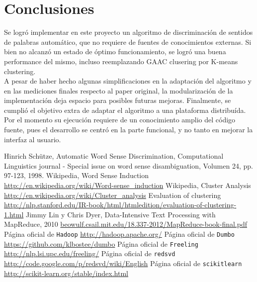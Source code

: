 \documentclass[11pt]{article}
\begin{document}
\section{Conclusiones}
Se logró implementar en este proyecto un algoritmo de discriminación de sentidos de palabras automático, que no requiere de fuentes de conocimientos externas. Si bien no alcanzó un estado de óptimo funcionamiento, se logró una buena performance del mismo, incluso reemplazando GAAC clusering por K-means clustering.\\
A pesar de haber hecho algunas simplificaciones en la adaptación del algoritmo y en las mediciones finales respecto al paper original, la modularización de la implementación deja espacio para posibles futuras mejoras.
Finalmente, se cumplió el objetivo extra de adaptar el algoritmo a una plataforma distribuída. Por el momento su ejecución requiere de un conocimiento amplio del código fuente, pues el desarrollo se centró en la parte funcional, y no tanto en mejorar la interfaz al usuario.


\begin{thebibliography}{99}

 Hinrich Schütze, Automatic Word Sense Discrimination, Computational Linguistics journal - Special issue on word sense disambiguation, Volumen 24, pp. 97-123, 1998.
 Wikipedia, Word Sense Induction \url{http://en.wikipedia.org/wiki/Word-sense_induction}
 Wikipedia, Cluster Analysis \url{http://en.wikipedia.org/wiki/Cluster_analysis}
 Evaluation of clustering \url{http://nlp.stanford.edu/IR-book/html/htmledition/evaluation-of-clustering-1.html}
 Jimmy Lin y Chris Dyer, Data-Intensive Text Processing with MapReduce, 2010 \url{beowulf.csail.mit.edu/18.337-2012/MapReduce-book-final.pdf}
 Página oficial de \texttt{Hadoop} \url{http://hadoop.apache.org/}
 Página oficial de \texttt{Dumbo} \url{https://github.com/klbostee/dumbo}
 Página oficial de \texttt{Freeling} \url{http://nlp.lsi.upc.edu/freeling/}
 Página oficial de \texttt{redsvd} \url{http://code.google.com/p/redsvd/wiki/English}
 Página oficial de \texttt{scikitlearn} \url{http://scikit-learn.org/stable/index.html}
\end{thebibliography}
\end{document}
